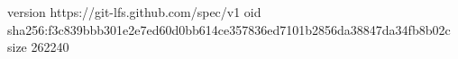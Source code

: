version https://git-lfs.github.com/spec/v1
oid sha256:f3c839bbb301e2e7ed60d0bb614ce357836ed7101b2856da38847da34fb8b02c
size 262240
